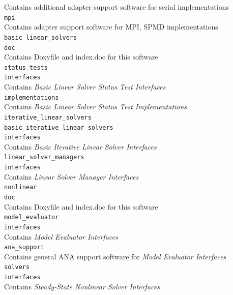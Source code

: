 \documentclass[pdf,ps2pdf,11pt]{SANDreport}
\begin{document}
\>\>\>\>\>\>\>Contains additional adapter support software for serial implementations \\
\>\>\>\>\>\>\texttt{mpi}\\
\>\>\>\>\>\>\>Contains adapter support software for MPI, SPMD implementations \\
\>\>\>\>\texttt{basic\_linear\_solvers} \\
\>\>\>\>\>\texttt{doc}\\
\>\>\>\>\>\>Contains Doxyfile and index.doc for this software \\
\>\>\>\>\>\texttt{status\_tests} \\
\>\>\>\>\>\>\texttt{interfaces} \\
\>\>\>\>\>\>\>Contains {}\textit{Basic Linear Solver Status Test Interfaces} \\
\>\>\>\>\>\>\texttt{implementations} \\
\>\>\>\>\>\>\>Contains {}\textit{Basic Linear Solver Status Test Implementations} \\
\>\>\>\>\>\texttt{iterative\_linear\_solvers} \\
\>\>\>\>\>\>\texttt{basic\_iterative\_linear\_solvers} \\
\>\>\>\>\>\>\>\texttt{interfaces} \\
\>\>\>\>\>\>\>\>Contains {}\textit{Basic Iterative Linear Solver Interfaces} \\
\>\>\>\>\>\>\texttt{linear\_solver\_managers} \\
\>\>\>\>\>\>\>\texttt{interfaces} \\
\>\>\>\>\>\>\>\>Contains {}\textit{Linear Solver Manager Interfaces} \\
\>\>\>\>\texttt{nonlinear} \\
\>\>\>\>\>\texttt{doc}\\
\>\>\>\>\>\>Contains Doxyfile and index.doc for this software \\
\>\>\>\>\>\texttt{model\_evaluator} \\
\>\>\>\>\>\>\texttt{interfaces} \\
\>\>\>\>\>\>\>Contains {}\textit{Model Evaluator Interfaces} \\
\>\>\>\>\>\>\texttt{ana\_support} \\
\>\>\>\>\>\>\>Contains general ANA support software for {}\textit{Model Evaluator Interfaces} \\
\>\>\>\>\>\texttt{solvers} \\
\>\>\>\>\>\>\texttt{interfaces} \\
\>\>\>\>\>\>\>Contains {}\textit{Steady-State Nonlinear Solver Interfaces} \\
\end{document}
